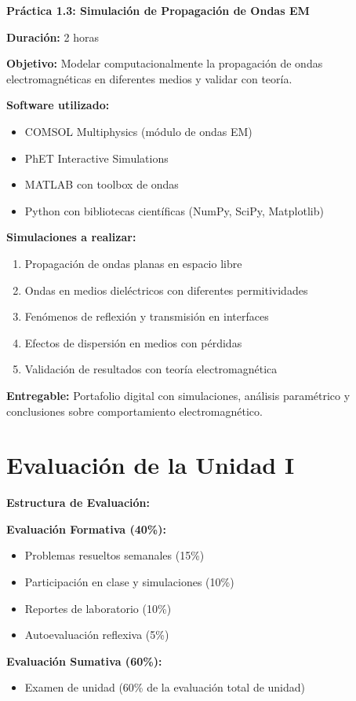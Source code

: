 \documentclass[12pt,a4paper]{book}
\begin{document}
\begin{practicabox}
\textbf{Práctica 1.3: Simulación de Propagación de Ondas EM}

\textbf{Duración:} 2 horas

\textbf{Objetivo:} Modelar computacionalmente la propagación de ondas electromagnéticas en diferentes medios y validar con teoría.

\textbf{Software utilizado:}
\begin{itemize}
\item COMSOL Multiphysics (módulo de ondas EM)
\item PhET Interactive Simulations
\item MATLAB con toolbox de ondas
\item Python con bibliotecas científicas (NumPy, SciPy, Matplotlib)
\end{itemize}

\textbf{Simulaciones a realizar:}
\begin{enumerate}
\item Propagación de ondas planas en espacio libre
\item Ondas en medios dieléctricos con diferentes permitividades
\item Fenómenos de reflexión y transmisión en interfaces
\item Efectos de dispersión en medios con pérdidas
\item Validación de resultados con teoría electromagnética
\end{enumerate}

\textbf{Entregable:} Portafolio digital con simulaciones, análisis paramétrico y conclusiones sobre comportamiento electromagnético.
\end{practicabox}

\section{Evaluación de la Unidad I}

\begin{evaluacionbox}
\textbf{Estructura de Evaluación:}

\textbf{Evaluación Formativa (40\%):}
\begin{itemize}
\item Problemas resueltos semanales (15\%)
\item Participación en clase y simulaciones (10\%)
\item Reportes de laboratorio (10\%)
\item Autoevaluación reflexiva (5\%)
\end{itemize}

\textbf{Evaluación Sumativa (60\%):}
\begin{itemize}
\item Examen de unidad (60\% de la evaluación total de unidad)
\end{itemize}
\end{evaluacionbox}
\end{document}

